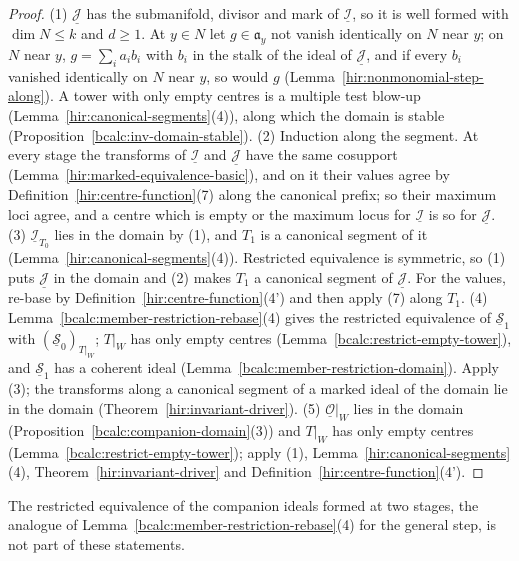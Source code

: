 \begin{proof}
\mixedleanok
(1) \(\underline{\mathcal J}\) has the submanifold, divisor and mark of \(\underline{\mathcal I}\), so it is well formed with \(\dim N\le k\) and \(d\ge1\). At \(y\in N\) let \(g\in\mathfrak a_y\)
not vanish identically on \(N\) near \(y\); on \(N\) near \(y\), \(g=\sum_ia_ib_i\) with \(b_i\) in the stalk of the ideal of \(\underline{\mathcal J}\), and if every \(b_i\) vanished
identically on \(N\) near \(y\), so would \(g\) (Lemma~\ref{hir:nonmonomial-step-along}). A tower with only empty centres is a multiple test blow-up
(Lemma~\ref{hir:canonical-segments}(4)), along which the domain is stable (Proposition~\ref{bcalc:inv-domain-stable}).
(2) Induction along the segment. At every stage the transforms of \(\underline{\mathcal I}\) and \(\underline{\mathcal J}\) have the same cosupport
(Lemma~\ref{hir:marked-equivalence-basic}), and on it their values agree by Definition~\ref{hir:centre-function}(7) along the canonical prefix; so their maximum loci
agree, and a centre which is empty or the maximum locus for \(\underline{\mathcal I}\) is so for \(\underline{\mathcal J}\).
(3) \(\underline{\mathcal I}_{T_0}\) lies in the domain by (1), and \(T_1\) is a canonical segment of it (Lemma~\ref{hir:canonical-segments}(4)). Restricted equivalence is
symmetric, so (1) puts \(\underline{\mathcal J}\) in the domain and (2) makes \(T_1\) a canonical segment of \(\underline{\mathcal J}\). For the values, re-base by
Definition~\ref{hir:centre-function}(4') and then apply (7) along \(T_1\).
(4) Lemma~\ref{bcalc:member-restriction-rebase}(4) gives the restricted equivalence of \(\underline{\mathcal S}_1\) with \((\underline{\mathcal S}_0)_{T|_W}\); \(T|_W\) has only empty centres
(Lemma~\ref{bcalc:restrict-empty-tower}), and \(\underline{\mathcal S}_1\) has a coherent ideal (Lemma~\ref{bcalc:member-restriction-domain}). Apply (3); the transforms along a
canonical segment of a marked ideal of the domain lie in the domain (Theorem~\ref{hir:invariant-driver}).
(5) \(\underline{\mathcal O}|_W\) lies in the domain (Proposition~\ref{bcalc:companion-domain}(3)) and \(T|_W\) has only empty centres (Lemma~\ref{bcalc:restrict-empty-tower});
apply (1), Lemma~\ref{hir:canonical-segments}(4), Theorem~\ref{hir:invariant-driver} and Definition~\ref{hir:centre-function}(4').
\end{proof}
The restricted equivalence of the companion ideals formed at two stages, the analogue of Lemma~\ref{bcalc:member-restriction-rebase}(4) for the general step, is not
part of these statements.

